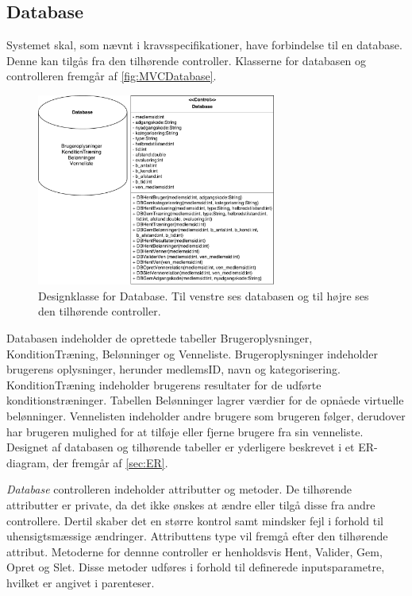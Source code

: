 \subsection*{Database} \label{sec:databaseDesign}
Systemet skal, som nævnt i kravsspecifikationer, have forbindelse til en database. Denne kan tilgås fra den tilhørende controller. Klasserne for databasen og controlleren fremgår af \autoref{fig:MVCDatabase}. 

\begin{figure} [H]
\centering
\includegraphics[width=0.7\textwidth]{figures/MVC/MVCDatabase}
\caption{Designklasse for Database. Til venstre ses databasen og til højre ses den tilhørende controller.}
\label{fig:MVCDatabase}
\end{figure}

\noindent
Databasen indeholder de oprettede tabeller Brugeroplysninger, KonditionTræning, Belønninger og Venneliste. Brugeroplysninger indeholder brugerens oplysninger, herunder medlemsID, navn og kategorisering. KonditionTræning indeholder brugerens resultater for de udførte konditionstræninger. Tabellen Belønninger lagrer værdier for de opnåede virtuelle belønninger. Vennelisten indeholder andre brugere som brugeren følger, derudover har brugeren mulighed for at tilføje eller fjerne brugere fra sin venneliste. Designet af databasen og tilhørende tabeller er yderligere beskrevet i et ER-diagram, der fremgår af \autoref{sec:ER}. 

\textit{Database} controlleren indeholder attributter og metoder. De tilhørende attributter er private, da det ikke ønskes at ændre eller tilgå disse fra andre controllere. Dertil skaber det en større kontrol samt mindsker fejl i forhold til uhensigtsmæssige ændringer. Attributtens type vil fremgå efter den tilhørende attribut. Metoderne for dennne controller er henholdsvis Hent, Valider, Gem, Opret og Slet. Disse metoder udføres i forhold til definerede inputsparametre, hvilket er angivet i parenteser. 

